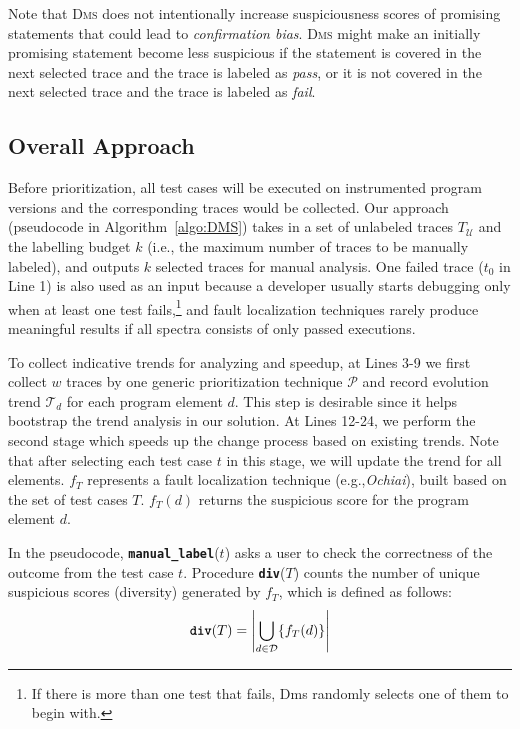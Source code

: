 Note that \textsc{Dms} does not intentionally increase suspiciousness scores of promising statements that could lead to {\em confirmation bias}.
\textsc{Dms} might make an initially promising statement become less suspicious if the statement is covered in the next selected trace and the trace is labeled as {\em pass}, or it is not covered in the next selected trace and the trace is labeled as {\em fail}.

\subsection{Overall Approach}

Before prioritization, all test cases will be executed on instrumented program versions and the corresponding traces would be collected.
Our approach (pseudocode in Algorithm~\ref{algo:DMS}) takes in a set of unlabeled traces $T_\mathcal{U}$ and the labelling budget $k$ (i.e., the maximum number of traces to be manually labeled), and outputs $k$ selected traces for manual analysis.
One failed trace ($t_{0}$ in Line 1) is also used as an input because a developer usually starts debugging only when at least one test fails,\footnote{If there is more than one test that fails, {\sc Dms} randomly selects one of them to begin with.} and fault localization techniques rarely produce meaningful results if all spectra consists of only passed executions.

To collect indicative trends for analyzing and speedup, at Lines 3-9 we first collect $w$ traces by one generic prioritization technique $\mathcal{P}$ and record evolution trend $\mathcal{T}_{d}$ for each program element $d$. This step is desirable since it helps bootstrap the trend analysis in our solution.
At Lines 12-24, we perform the second stage which speeds up the change process based on existing trends. Note that after selecting each test case $t$ in this stage, we will update the trend for all elements. $f_{T}$ represents a fault localization technique (e.g.,{\em Ochiai}), built based on the set of test cases $T$. $f_{T}(d)$ returns the suspicious score for the program element $d$.




In the pseudocode, \texttt{\textbf{manual\_label}}($t$) asks a user to check
the correctness of the outcome from the test case $t$. Procedure \texttt{\textbf{div}}($T$)
counts the number of unique suspicious scores (diversity) generated by $f_T$, which is defined as follows:
\begin{equation}
	\texttt{\textbf{div}}(T) = \left| \bigcup\limits_{d \in \mathcal{D}} \{f_{T}(d)\} \right|
\end{equation}

